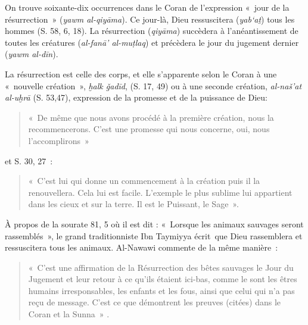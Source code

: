

On trouve soixante-dix occurrences dans le Coran de l'expression «~jour
de la résurrection~» (\emph{yawm al-qiyāma}). Ce jour-là, Dieu
ressuscitera (\emph{yab`aṯ}) tous les hommes (S. 58, 6, 18). La
résurrection (\emph{qiyāma}) succèdera à l'anéantissement de toutes les
créatures (\emph{al-fanā' al-muṭlaq}) et précèdera le jour du jugement
dernier (\emph{yawm al-dīn}).

La résurrection est celle des corps, et elle s'apparente selon le Coran
à une «~nouvelle création~», \emph{ḫalk ǧadīd}, (S. 17, 49) ou à une
seconde création, \emph{al-naš'at al-uḫrā} (S. 53,47), expression de la
promesse et de la puissance de Dieu: 
\begin{quote}
  «~De même que
  nous avons procédé à la première création, nous la recommencerons.
  C'est une promesse qui nous concerne, oui, nous l'accomplirons~»  
\end{quote} et S.
  30, 27~: 
  \begin{quote}
     «~C'est lui qui donne un commencement à la création puis il
  la renouvellera. Cela lui est facile. L'exemple le plus sublime lui
  appartient dans les cieux et sur la terre. Il est le Puissant, le
  Sage~». 
  \end{quote}


À propos de la sourate 81, 5 où il est dit : «~Lorsque les animaux
sauvages seront rassemblés~», le grand traditionniste Ibn Taymiyya
écrit~que Dieu rassemblera et ressuscitera tous les animaux. Al-Nawawi
commente de la même manière~: 

\begin{quote}
  «~C'est une affirmation de la Résurrection
des bêtes sauvages le Jour du Jugement et leur retour à ce qu'ils
étaient ici-bas, comme le sont les êtres humains irresponsables, les
enfants et les fous, ainsi que celui qui n'a pas reçu de message. C'est
ce que démontrent les preuves (citées) dans le Coran et la
Sunna~»  .
\end{quote}

